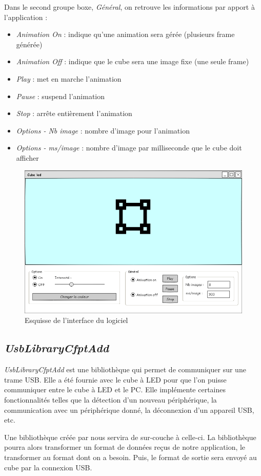 \documentclass[a4paper,12pt]{article}
\begin{document}
\noindent Dans le second groupe boxe, \emph{Général}, on retrouve les informations par apport à l'application :
\begin{itemize}
	\item \emph{Animation On} : indique qu'une animation sera gérée (plusieurs frame générée)
	\item \emph{Animation Off} : indique que le cube sera une image fixe (une seule frame)
	\item \emph{Play} : met en marche l'animation
	\item \emph{Pause} : suspend l'animation
	\item \emph{Stop} : arrête entièrement l'animation
	\item \emph{Options - Nb image} : nombre d'image pour l'animation
	\item \emph{Options - ms/image} : nombre d'image par milliseconde que le cube doit afficher
\end{itemize}
\begin{figure}[htp]
	\centering
	\includegraphics[width=.60\textwidth]{img/windform.png}
	\caption{Esquisse de l'interface du logiciel}
	\label{interface}
\end{figure}

\subsection{\emph{UsbLibraryCfptAdd}}
\emph{UsbLibraryCfptAdd} est une bibliothèque qui permet de communiquer sur une trame USB. Elle a été fournie avec le cube à LED pour que l'on puisse communiquer entre le cube à LED et le PC. Elle implémente certaines fonctionnalités telles que la détection d'un nouveau périphérique, la communication avec un périphérique donné, la déconnexion d'un appareil USB, etc. 

Une bibliothèque créée par nous servira de sur-couche à celle-ci. La bibliothèque pourra alors transformer un format de données reçus de notre application, le transformer au format dont on a besoin. Puis, le format de sortie sera envoyé au cube par la connexion USB.
\newpage
\end{document}
